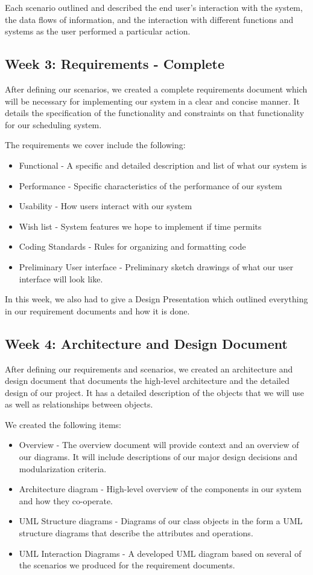 \documentclass[12pt]{article}
\begin{document}
Each scenario outlined and described the end user's interaction with the system, the data flows of information, and the interaction with different functions and systems as the user performed a particular action. 

\subsection*{Week 3: Requirements - Complete}

After defining our scenarios, we created a complete requirements document which will be necessary for implementing our system in a clear and concise manner. It details the specification of the functionality and constraints on that functionality for our scheduling system. 

The requirements we cover include the following:
\begin{itemize}
\item Functional - A specific and detailed description and list of what our system is
\item Performance - Specific characteristics of the performance of our system
\item Usability - How users interact with our system
\item Wish list - System features we hope to implement if time permits
\item Coding Standards - Rules for organizing and formatting code
\item Preliminary User interface - Preliminary sketch drawings of what our user interface will look like. 
\end{itemize}
In this week, we also had to give a Design Presentation which outlined everything in our requirement documents and how it is done. 

\subsection*{Week 4: Architecture and Design Document}

After defining our requirements and scenarios, we created an architecture and design document that documents the high-level architecture and the detailed design of our project. It has a detailed description of the objects that we will use as well as relationships between objects. 

We created the following items: 
\begin{itemize}
\item Overview - The overview document will provide context and an overview of our diagrams. It will include descriptions of our major design decisions and modularization criteria. 
\item Architecture diagram - High-level overview of the components in our system and how they co-operate. 
\item UML Structure diagrams - Diagrams of our class objects in the form a UML structure diagrams that describe the attributes and operations.
\item UML Interaction Diagrams - A developed UML diagram based on several of the scenarios we produced for the requirement documents. 
\end{itemize}
\end{document}
